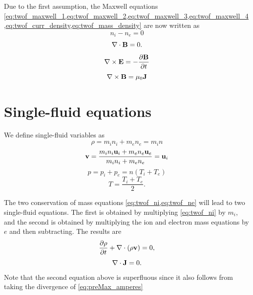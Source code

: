 \documentclass[a4paper,11pt]{report}
\begin{document}
Due to the first assumption, the Maxwell equations \cref{eq:twof_maxwell_1,eq:twof_maxwell_2,eq:twof_maxwell_3,eq:twof_maxwell_4,eq:twof_curr_density,eq:twof_mass_density} are now written as
\begin{equation}
\label{eq:preMax_gauss}
n_i - n_e = 0
\end{equation}
\begin{equation}
\label{eq:preMax_Bdiv}
\nabla \cdot \mathbf{B} = 0.
\end{equation}
\begin{equation}
\label{eq:preMax_faradays}
\nabla \times \mathbf{E} = -\frac{ \partial \mathbf{B}}{\partial t}
\end{equation}
\begin{equation}
\label{eq:preMax_amperes}
\nabla \times \mathbf{B} = \mu_0 \mathbf{J} 
\end{equation}

\section{Single-fluid equations}
We define single-fluid variables as
\begin{equation}
    \rho = m_i n_i + m_e n_e = m_i n
\end{equation}
\begin{equation}
    \mathbf{v} = \frac{m_i n_i \mathbf{u}_i + m_e n_e \mathbf{u}_e}{m_i n_i + m_e n_e} = \mathbf{u}_i
\end{equation}
\begin{equation}
    p = p_i + p_e = n (T_i + T_e)
\end{equation}
\begin{equation}
    T = \frac{T_i + T_e}{2}.
\end{equation}

The two conservation of mass equations \cref{eq:twof_ni,eq:twof_ne} will lead to two single-fluid equations. The first is obtained by multiplying \cref{eq:twof_ni} by $m_i$, and the second is obtained by multiplying the ion and electron mass equations by $e$ and then subtracting. The results are
\begin{equation}
    \frac{\partial \rho}{\partial t} + \nabla \cdot (\rho \mathbf{v}) = 0,
\end{equation}
\begin{equation}
    \nabla \cdot \mathbf{J} = 0.
\end{equation}
Note that the second equation above is superfluous since it also follows from taking the divergence of \cref{eq:preMax_amperes}
\end{document}

